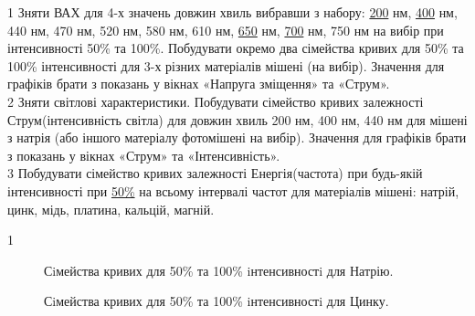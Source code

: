 \documentclass[a4paper,14pt]{extreport}
\begin{document}
1 Зняти ВАХ для 4-х значень довжин хвиль вибравши з набору: \underline{200} нм, \underline{400} нм, 440 нм, 470
нм, 520 нм, 580 нм, 610 нм, \underline{650} нм, \underline{700} нм, 750 нм на вибір при інтенсивності 50\% та 100\%. Побудувати окремо два сімейства кривих для 50\% та 100\% інтенсивності для 3-х різних матеріалів мішені (на вибір). Значення для графіків брати з показань у вікнах «Напруга зміщення» та «Струм».\\

2 Зняти світлові характеристики. Побудувати сімейство кривих залежності
Струм(інтенсивність світла) для довжин хвиль 200 нм, 400 нм, 440 нм для мішені з натрія (або іншого матеріалу фотомішені на вибір). Значення для графіків брати з показань у вікнах «Струм» та «Інтенсивність».\\

3 Побудувати сімейство кривих залежності Енергія(частота) при будь-якій інтенсивності при \underline{50\%} на
всьому інтервалі частот для матеріалів мішені: натрій, цинк, мідь, платина, кальцій, магній.\\

\vspace{1cm}

\begin{center}1\end{center}
\begin{figure}[h]
\caption{Сiмейства кривих для 50\% та 100\% iнтенсивностi для Натрію.}
\label{ris1}
\end{figure}

\begin{figure}[h]
\caption{Сiмейства кривих для 50\% та 100\% iнтенсивностi для Цинку.}
\label{ris1}
\end{figure}
\end{document}
